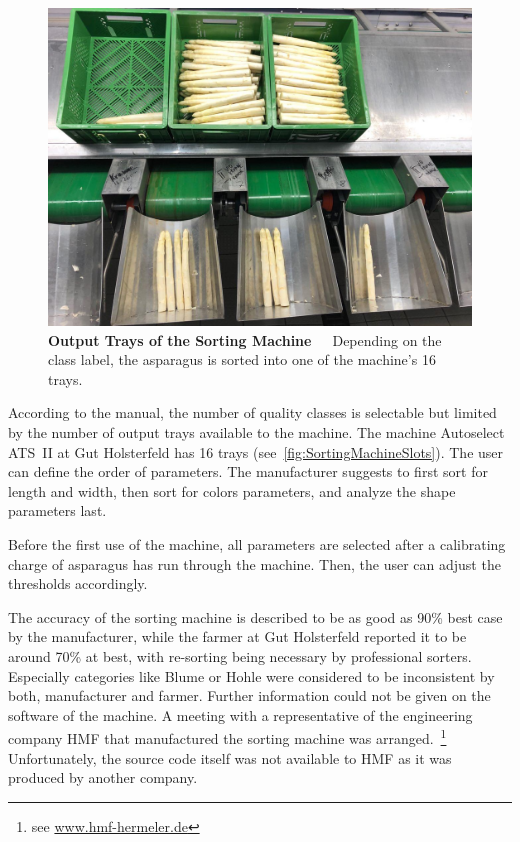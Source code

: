 \begin{figure}[h]
	\centering
	\includegraphics[scale=0.3]{Figures/chapter02/sorting_machine_slots.png}
	\decoRule
	\caption[Output Trays of the Sorting Machine]{\textbf{Output Trays of the Sorting Machine}~~~Depending on the class label, the asparagus is sorted into one of the machine's 16 trays.}
	\label{fig:SortingMachineSlots}
\end{figure}

According to the manual, the number of quality classes is selectable but limited by the number of output trays available to the machine. The machine Autoselect ATS~II at Gut Holsterfeld has 16 trays (see~\autoref{fig:SortingMachineSlots}). The user can define the order of parameters. The manufacturer suggests to first sort for length and width, then sort for colors parameters, and analyze the shape parameters last.

Before the first use of the machine, all parameters are selected after a calibrating charge of asparagus has run through the machine. Then, the user can adjust the thresholds accordingly.

The accuracy of the sorting machine is described to be as good as 90\% best case by the manufacturer, while the farmer at Gut Holsterfeld reported it to be around 70\% at best, with re-sorting being necessary by professional sorters. Especially categories like Blume or Hohle were considered to be inconsistent by both, manufacturer and farmer. Further information could not be given on the software of the machine. A meeting with a representative of the engineering company HMF that manufactured the sorting machine was arranged.~\footnote{ see \url{www.hmf-hermeler.de}} Unfortunately, the source code itself was not available to HMF as it was produced by another company. 

